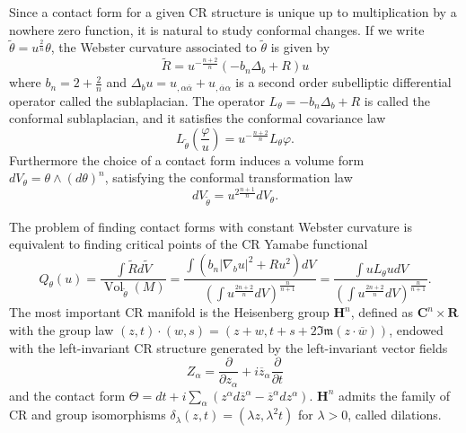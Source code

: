 \documentclass[10pt,a4paper]{amsart}
\renewcommand{\phi}{\varphi}
\newcommand{\de}{\partial}
\newcommand{\R}{\mathbf{R}}
\newcommand{\C}{\mathbf{C}}
\renewcommand{\H}{\mathbf{H}}
\newcommand{\g}[1]{\mathfrak{#1}}
\DeclareMathOperator{\Vol}{Vol}
\begin{document}
Since a contact form for a given CR structure is unique up to multiplication by a nowhere zero function, it is natural to study conformal changes. If we write $\widetilde{\theta}=u^{\frac{2}{n}}\theta$, the Webster curvature associated to $\widetilde{\theta}$ is given by
\begin{equation}\label{ConformalChangeCurvature}
 \widetilde{R} = u^{-\frac{n+2}{n}}\left(-b_n\Delta_b +R \right)u
\end{equation}
where $b_n=2+\frac{2}{n}$ and $\Delta_bu= u_{,\alpha\overline{\alpha}}+u_{,\overline{\alpha}\alpha}$ is a second order subelliptic differential operator called the sublaplacian.
The operator $L_{\theta}=-b_n\Delta_b+R$ is called the conformal sublaplacian, and it satisfies the conformal covariance law
\begin{equation}\label{TransformationSublaplacian}
L_{\widetilde{\theta}}\left(\frac{\phi}{u}\right) = u^{-\frac{n+2}{n}}L_{\theta}\phi.
\end{equation}
Furthermore the choice of a contact form induces a volume form $dV_{\theta}=\theta\wedge(d\theta)^n$, satisfying the conformal transformation law
\begin{equation}\label{TransformationVolumeForm}
dV_{\widetilde{\theta}} = u^{2\frac{n+1}{n}}dV_{\theta}.
\end{equation}

The problem of finding contact forms with constant Webster curvature is equivalent to finding critical points of the CR Yamabe functional
\begin{equation}\label{CRYamabeFunctional}
 Q_{\theta}(u) = \frac{\int\widetilde{R}d\widetilde{V}}{\Vol_{\widetilde{\theta}}(M)}=\frac{\int\left(b_n|\nabla_bu|^2+Ru^2\right)dV}{\left(\int u^{\frac{2n+2}{n}} dV\right)^{\frac{n}{n+1}}} = \frac{\int uL_{\theta}udV}{\left(\int u^{\frac{2n+2}{n}} dV\right)^{\frac{n}{n+1}}}.
\end{equation}
The most important CR manifold is the Heisenberg group $\H^n$, defined as $\C^n\times\R$ with the group law $(z,t)\cdot(w,s) = (z+w,t+s+2\g{Im}(z\cdot\overline{w}))$, endowed with the left-invariant CR structure generated by the left-invariant vector fields
$$Z_{\alpha}= \frac{\de}{\de z_{\alpha}} +i\overline{z}_{\alpha}\frac{\de}{\de t}$$
and the contact form $\Theta= dt+i\sum_{\alpha}\left( z^{\alpha}d\overline{z}^{\alpha}-\overline{z}^{\alpha}dz^{\alpha}\right)$. $\H^n$ admits the family of CR and group isomorphisms $\delta_{\lambda}(z,t)=(\lambda z,\lambda^2t)$ for $\lambda>0$, called dilations.
\end{document}
